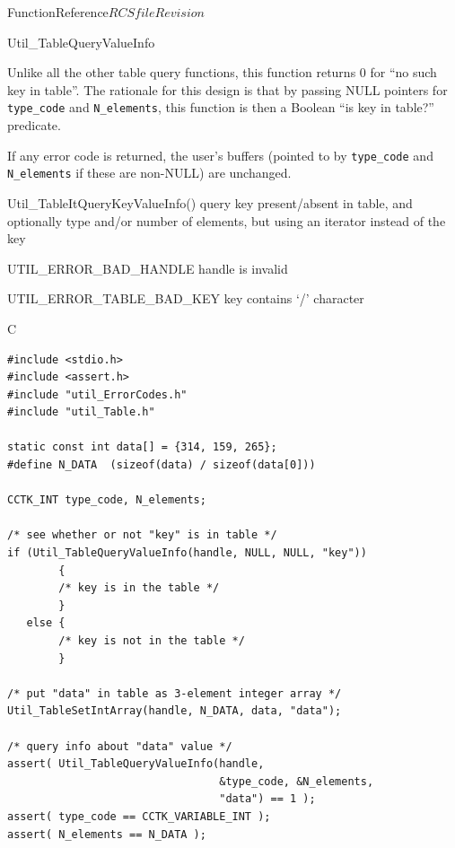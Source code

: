 \begin{cactuspart}{FunctionReference}{$RCSfile$}{$Revision$}
\begin{FunctionDescription}{Util\_TableQueryValueInfo}
\begin{Discussion}
Unlike all the other table query functions, this function returns
0 for ``no such key in table''.  The rationale for this design is that
by passing NULL pointers for \verb|type_code| and \verb|N_elements|, this
function is then a Boolean ``is key in table?'' predicate.

If any error code is returned, the user's buffers (pointed to by
\verb|type_code| and \verb|N_elements| if these are non-NULL) are
unchanged.
\end{Discussion}

\begin{SeeAlsoSection}
\begin{SeeAlso}{Util\_TableItQueryKeyValueInfo()}
query key present/absent in table, and optionally type and/or number
of elements, but using an iterator instead of the key
\end{SeeAlso}
\end{SeeAlsoSection}

\begin{ErrorSection}
\begin{Error}{UTIL\_ERROR\_BAD\_HANDLE}
handle is invalid
\end{Error}
\begin{Error}{UTIL\_ERROR\_TABLE\_BAD\_KEY}
key contains `/' character
\end{Error}
\end{ErrorSection}

\begin{ExampleSection}
\begin{Example}{C}
\begin{verbatim}
#include <stdio.h>
#include <assert.h>
#include "util_ErrorCodes.h"
#include "util_Table.h"

static const int data[] = {314, 159, 265};
#define N_DATA  (sizeof(data) / sizeof(data[0]))

CCTK_INT type_code, N_elements;

/* see whether or not "key" is in table */
if (Util_TableQueryValueInfo(handle, NULL, NULL, "key"))
        {
        /* key is in the table */
        }
   else {
        /* key is not in the table */
        }

/* put "data" in table as 3-element integer array */
Util_TableSetIntArray(handle, N_DATA, data, "data");

/* query info about "data" value */
assert( Util_TableQueryValueInfo(handle,
                                 &type_code, &N_elements,
                                 "data") == 1 );
assert( type_code == CCTK_VARIABLE_INT );
assert( N_elements == N_DATA );
\end{verbatim}
\end{Example}
\end{ExampleSection}
\end{FunctionDescription}


\end{cactuspart}
